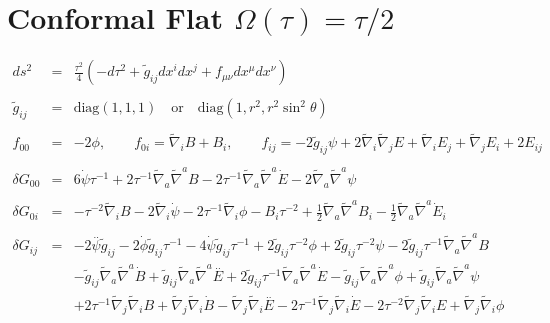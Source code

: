 \documentclass[10pt,letterpaper]{article}
\numberwithin{equation}{section}
\begin{document}
\section{Conformal Flat $\Omega(\tau)=\tau/2$}
%
\begin{eqnarray}
ds^2 &=& \frac{\tau^2}{4}\left( -d\tau^2 + \tilde g_{ij} dx^i dx^j + f_{\mu\nu} dx^\mu dx^\nu\right)
\\ \nonumber\\
\tilde g_{ij} &=& \text{diag}(1,1,1)\quad\text{or}\quad \text{diag}(1,r^2,r^2\sin^2\theta)
\\ \nonumber\\
f_{00} &=& -2\phi,\qquad f_{0i}= \tilde \nabla_i B + B_i,\qquad 
f_{ij} = -2 \tilde g_{ij}\psi + 2\tilde\nabla_i\tilde \nabla_j E + \tilde \nabla_i E_j + \tilde \nabla_j E_i + 2E_{ij}
\\ \nonumber\\
\delta G_{00} &=& 6 \dot{\psi} \tau^{-1} + 2 \tau^{-1} \tilde{\nabla}_{a}\tilde{\nabla}^{a}B - 2 \tau^{-1} \tilde{\nabla}_{a}\tilde{\nabla}^{a}\dot{E} - 2 \tilde{\nabla}_{a}\tilde{\nabla}^{a}\psi 
\\ \nonumber\\
\delta G_{0i} &=&- \tau^{-2} \tilde{\nabla}_{i}B - 2 \tilde{\nabla}_{i}\dot{\psi} - 2 \tau^{-1} \tilde{\nabla}_{i}\phi 
- B_{i} \tau^{-2} + \tfrac{1}{2} \tilde{\nabla}_{a}\tilde{\nabla}^{a}B_{i} -  \tfrac{1}{2} \tilde{\nabla}_{a}\tilde{\nabla}^{a}\dot{E}_{i}
\\ \nonumber\\
\delta G_{ij}&=&-2 \overset{..}{\psi} \tilde{g}_{ij}
- 2 \dot{\phi} \tilde{g}_{ij} \tau^{-1}
- 4 \dot{\psi} \tilde{g}_{ij} \tau^{-1}
+ 2 \tilde{g}_{ij} \tau^{-2} \phi
+ 2 \tilde{g}_{ij} \tau^{-2} \psi
- 2 \tilde{g}_{ij} \tau^{-1} \tilde{\nabla}_{a}\tilde{\nabla}^{a}B\nonumber\\
&& -  \tilde{g}_{ij} \tilde{\nabla}_{a}\tilde{\nabla}^{a}\dot{B}
+ \tilde{g}_{ij} \tilde{\nabla}_{a}\tilde{\nabla}^{a}\overset{..}{E}
+ 2 \tilde{g}_{ij} \tau^{-1} \tilde{\nabla}_{a}\tilde{\nabla}^{a}\dot{E}
-  \tilde{g}_{ij} \tilde{\nabla}_{a}\tilde{\nabla}^{a}\phi
+ \tilde{g}_{ij} \tilde{\nabla}_{a}\tilde{\nabla}^{a}\psi\nonumber\\
&& + 2 \tau^{-1} \tilde{\nabla}_{j}\tilde{\nabla}_{i}B
+ \tilde{\nabla}_{j}\tilde{\nabla}_{i}\dot{B}
-  \tilde{\nabla}_{j}\tilde{\nabla}_{i}\overset{..}{E}
- 2 \tau^{-1} \tilde{\nabla}_{j}\tilde{\nabla}_{i}\dot{E}
- 2 \tau^{-2} \tilde{\nabla}_{j}\tilde{\nabla}_{i}E
+ \tilde{\nabla}_{j}\tilde{\nabla}_{i}\phi

\end{eqnarray}
\end{document}
